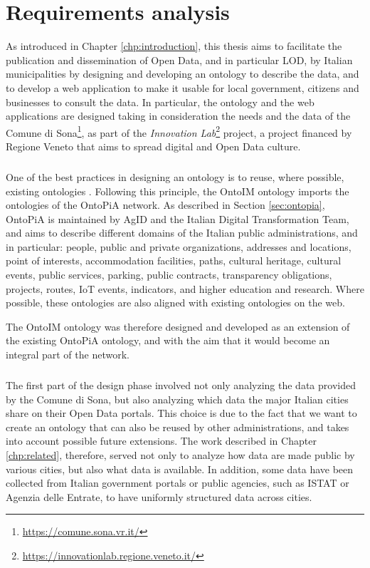\chapter{Requirements analysis}
\label{chp:requirements}

As introduced in Chapter \ref{chp:introduction}, this thesis aims to facilitate the publication and dissemination of Open Data, and in particular \acl{LOD}, by Italian municipalities by designing and developing an ontology to describe the data, and to develop a web application to make it usable for local government, citizens and businesses to consult the data. In particular, the ontology and the web applications are designed taking in consideration the needs and the data of the Comune di Sona\footnote{\url{https://comune.sona.vr.it/}}, as part of the \textit{Innovation Lab}\footnote{\url{https://innovationlab.regione.veneto.it/}} project, a project financed by Regione Veneto that aims to spread digital and Open Data culture.

\paragraph*{}
One of the best practices in designing an ontology is to reuse, where possible, existing ontologies \cite{noy2001ontology}. Following this principle, the OntoIM ontology imports the ontologies of the OntoPiA network. As described in Section \ref{sec:ontopia}, OntoPiA is maintained by \ac{AgID} and the Italian Digital Transformation Team, and aims to describe different domains of the Italian public administrations, and in particular: people, public and private organizations, addresses and locations, point of interests, accommodation facilities, paths, cultural heritage, cultural events, public services, parking, public contracts, transparency obligations, projects, routes, IoT events, indicators, and higher education and research. Where possible, these ontologies are also aligned with existing ontologies on the web.

The OntoIM ontology was therefore designed and developed as an extension of the existing OntoPiA ontology, and with the aim that it would become an integral part of the network.

\paragraph*{}
The first part of the design phase involved not only analyzing the data provided by the Comune di Sona, but also analyzing which data the major Italian cities share on their Open Data portals. This choice is due to the fact that we want to create an ontology that can also be reused by other administrations, and takes into account possible future extensions. The work described in Chapter \ref{chp:related}, therefore, served not only to analyze how data are made public by various cities, but also what data is available. In addition, some data have been collected from Italian government portals or public agencies, such as ISTAT or Agenzia delle Entrate, to have uniformly structured data across cities.

